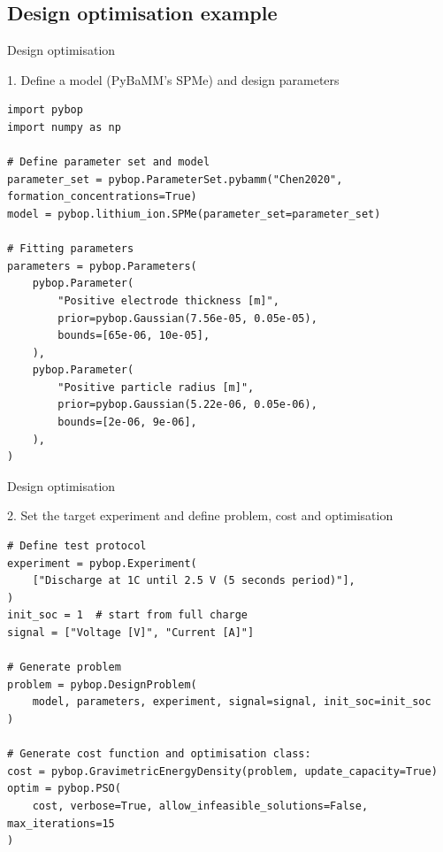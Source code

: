 \documentclass[aspectratio=169]{beamer}
\begin{document}
\subsection{Design optimisation example}
\begin{frame}[fragile,t]{Design optimisation}
    \vspace{-1.5cm}
    \begin{block}{1. Define a model (PyBaMM's SPMe) and design parameters}
    \begin{lstlisting}[firstnumber=1, xleftmargin=10pt]
import pybop
import numpy as np

# Define parameter set and model
parameter_set = pybop.ParameterSet.pybamm("Chen2020", formation_concentrations=True)
model = pybop.lithium_ion.SPMe(parameter_set=parameter_set)

# Fitting parameters
parameters = pybop.Parameters(
    pybop.Parameter(
        "Positive electrode thickness [m]",
        prior=pybop.Gaussian(7.56e-05, 0.05e-05),
        bounds=[65e-06, 10e-05],
    ),
    pybop.Parameter(
        "Positive particle radius [m]",
        prior=pybop.Gaussian(5.22e-06, 0.05e-06),
        bounds=[2e-06, 9e-06],
    ),
)
    \end{lstlisting}
    \end{block}
\end{frame}

\begin{frame}[fragile,t]{Design optimisation}
    \vspace{-1cm}
    \begin{block}{2. Set the target experiment and define problem, cost and optimisation}
    \begin{lstlisting}[firstnumber=1, xleftmargin=10pt]
# Define test protocol
experiment = pybop.Experiment(
    ["Discharge at 1C until 2.5 V (5 seconds period)"],
)
init_soc = 1  # start from full charge
signal = ["Voltage [V]", "Current [A]"]

# Generate problem
problem = pybop.DesignProblem(
    model, parameters, experiment, signal=signal, init_soc=init_soc
)

# Generate cost function and optimisation class:
cost = pybop.GravimetricEnergyDensity(problem, update_capacity=True)
optim = pybop.PSO(
    cost, verbose=True, allow_infeasible_solutions=False, max_iterations=15
)
    \end{lstlisting}
    \end{block}
\end{frame}
\end{document}
